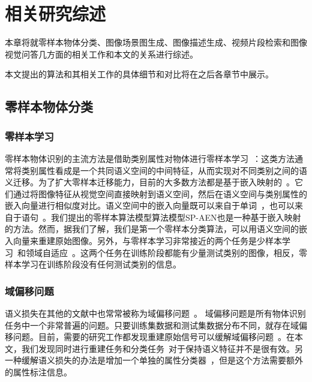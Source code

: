 \chapter{相关研究综述}

本章将就零样本物体分类、图像场景图生成、图像描述生成、视频片段检索和图像视觉问答几方面的相关工作和本文的关系进行综述。

本文提出的算法和其相关工作的具体细节和对比将在之后各章节中展示。


\section{零样本物体分类}

\subsection{零样本学习}
零样本物体识别的主流方法是借助类别属性对物体进行零样本学习~\cite{farhadi2009describing,lampert2009learning,romera2015embarrassingly,norouzi2014zero,demirel2017attributes2classname,jiang2017learning}：这类方法通常将类别属性看成是一个共同语义空间的中间特征，从而实现对不同类别之间的语义迁移。为了扩大零样本迁移能力，目前的大多数方法都是基于嵌入映射的~\cite{frome2013devise,akata2015label,akata2015evaluation,romera2015embarrassingly,xian2016latent,socher2013zero,kodirov2017semantic,li2017zero}。它们通过将图像特征从视觉空间直接映射到语义空间，然后在语义空间与类别属性的嵌入向量进行相似度对比。语义空间中的嵌入向量既可以来自于单词~\cite{mikolov2013distributed,pennington2014glove}，也可以来自于语句~\cite{lei2015predicting,elhoseiny2013write}。我们提出的零样本算法模型算法模型SP-AEN也是一种基于嵌入映射的方法。然而，据我们了解，我们是第一个零样本分类算法，可以用语义空间的嵌入向量来重建原始图像。另外，与零样本学习非常接近的两个任务是少样本学习~\cite{hariharan2017low}和领域自适应~\cite{motiian2017unified,panareda2017open}。这两个任务在训练阶段都能有少量测试类别的图像，相反，零样本学习在训练阶段没有任何测试类别的信息。


\subsection{域偏移问题}
语义损失在其他的文献中也常常被称为域偏移问题~\cite{fu2015transductive,saenko2010adapting}。
域偏移问题是所有物体识别任务中一个非常普遍的问题。只要训练集数据和测试集数据分布不同，就存在域偏移问题。目前，需要的研究工作都发现重建原始信号可以缓解域偏移问题~\cite{kim2017learning}。在本文，我们发现同时进行重建任务和分类任务~\cite{kodirov2017semantic}对于保持语义特征并不是很有效。另一种缓解语义损失的办法是增加一个单独的属性分类器~\cite{morgado2017semantically}，但是这个方法需要额外的属性标注信息。


